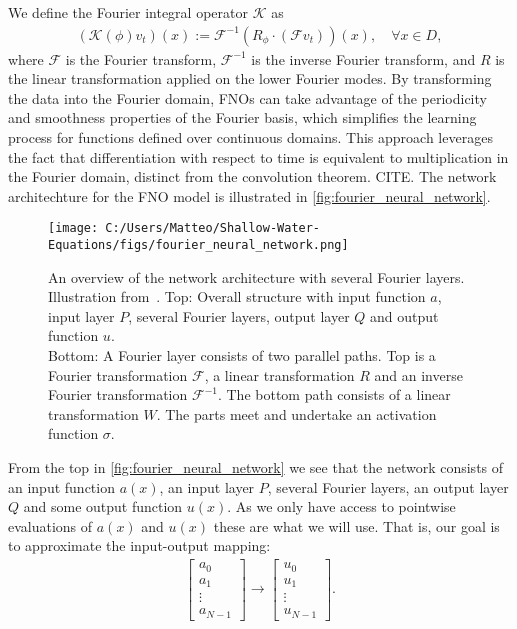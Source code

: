 We define the Fourier integral operator $\mathcal{K}$ as 
\begin{align}
    \left( \mathcal{K}(\phi)v_t \right) (x) := \mathcal{F}^{-1} \left( R_{\phi} \cdot (\mathcal{F}v_t ) \right)(x), \quad \forall x \in D,
\end{align}
where $\mathcal{F}$ is the Fourier transform, $\mathcal{F}^{-1}$ is the inverse Fourier transform, and $R$ is the linear transformation applied on the lower Fourier modes. 
By transforming the data into the Fourier domain, FNOs can take advantage of the periodicity and smoothness properties of the Fourier basis, which simplifies the learning process for functions defined over continuous domains.
This approach leverages the fact that differentiation with respect to time is equivalent to multiplication in the Fourier domain, distinct from the convolution theorem. CITE.
The network architechture for the FNO model is illustrated in \autoref{fig:fourier_neural_network}.
\begin{figure}[H]
    \centering
    \texttt{[image: C:/Users/Matteo/Shallow-Water-Equations/figs/fourier\_neural\_network.png]}
    \caption{An overview of the network architecture with several Fourier layers. Illustration from~\cite{FNO_2021}.
            Top: Overall structure with input function $a$, input layer $P$, several Fourier layers, output layer $Q$ and output function $u$.\\
            Bottom: A Fourier layer consists of two parallel paths. Top is a Fourier transformation $\mathcal{F}$, a linear transformation $R$ and an inverse Fourier transformation $\mathcal{F}^{-1}$.
            The bottom path consists of a linear transformation $W$. The parts meet and undertake an activation function $\sigma$.}\label{fig:fourier_neural_network}
\end{figure}
From the top in \autoref{fig:fourier_neural_network} we see that the network consists of an input function $a(x)$, an input layer $P$, several Fourier layers, an output layer $Q$ and some output function $u(x)$.
As we only have access to pointwise evaluations of $a(x)$ and $u(x)$ these are what we will use. 
That is, our goal is to approximate the input-output mapping: 
\begin{align*}
    \begin{bmatrix}
        a_0 \\
        a_1 \\
        \vdots \\
        a_{N-1}
    \end{bmatrix}
    \to
    \begin{bmatrix}
        u_0 \\
        u_1 \\
        \vdots \\
        u_{N-1}
    \end{bmatrix}.
\end{align*}
